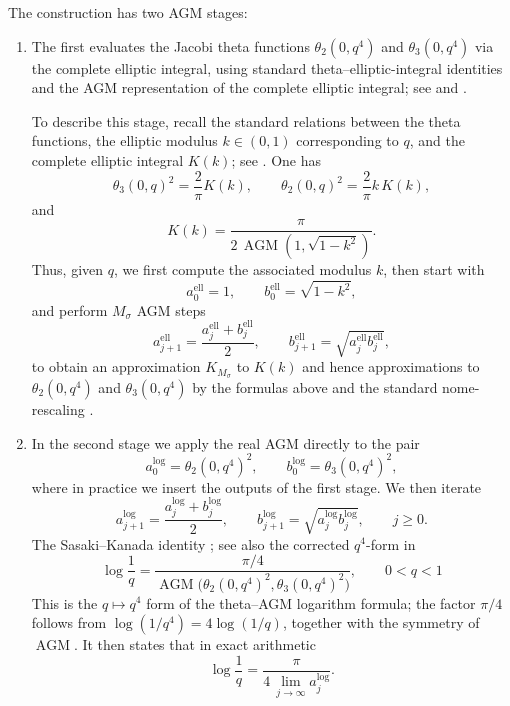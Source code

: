 \documentclass{article}
\theoremstyle{plain}
\theoremstyle{definition}
\theoremstyle{remark}
\begin{document}
The construction has two AGM stages: 
\begin{enumerate}
    \item The first evaluates the Jacobi theta functions $\theta_2(0,q^4)$ and $\theta_3(0,q^4)$ via the complete elliptic integral,  {using standard theta--elliptic-integral identities and the AGM representation of the complete elliptic integral; see \citet[Chs.~2 and 7]{borwein1987piagm} and \citet{brent2018borwein}.}

To describe this stage, recall the standard relations between the theta functions, the elliptic modulus $k\in(0,1)$ corresponding to $q$, and the complete elliptic integral $K(k)$; see  {\citet[Chs.~2 and 7]{borwein1987piagm}}. One has
\[
\theta_3(0,q)^2 = \frac{2}{\pi}K(k),
\qquad
\theta_2(0,q)^2 = \frac{2}{\pi}k\,K(k),
\]
and
\[
K(k)=\frac{\pi}{2\,\operatorname{AGM}(1,\sqrt{1-k^2})}.
\]
Thus, given $q$, we first compute the associated modulus $k$, then start with
\[
a_0^{\mathrm{ell}}=1,\qquad b_0^{\mathrm{ell}}=\sqrt{1-k^2},
\]
and perform $M_\sigma$ AGM steps
\[
a_{j+1}^{\mathrm{ell}}=\frac{a_j^{\mathrm{ell}}+b_j^{\mathrm{ell}}}{2},
\qquad
b_{j+1}^{\mathrm{ell}}=\sqrt{a_j^{\mathrm{ell}}b_j^{\mathrm{ell}}},
\]
to obtain an approximation $K_{M_\sigma}$ to $K(k)$ and hence approximations to $\theta_2(0,q^4)$ and $\theta_3(0,q^4)$ by the formulas above and the standard nome-rescaling  {\citep[Chs.~2 and 7]{borwein1987piagm}}. 

\item In the second stage we apply the real AGM directly to the pair
\[
a_0^{\log}=\theta_2(0,q^4)^2,\qquad
b_0^{\log}=\theta_3(0,q^4)^2,
\]
where in practice we insert the outputs of the first stage. We then iterate
\[
a_{j+1}^{\log}=\frac{a_j^{\log}+b_j^{\log}}{2},
\qquad
b_{j+1}^{\log}=\sqrt{a_j^{\log}b_j^{\log}},
\qquad j\ge 0.
\]
The Sasaki--Kanada identity  {\citep{sasaki1982log}; see also the corrected \(q^4\)-form in \citealt[Eq.~(40)]{brent2018borwein}}
\begin{equation}
\label{eq:sasaki-kanada}
\log\frac{1}{q}
=
\frac{\pi/4}{\operatorname{AGM}\!\bigl(\theta_2(0,q^4)^2,\theta_3(0,q^4)^2\bigr)},
\qquad 0<q<1
\end{equation}
 {This is the \(q\mapsto q^4\) form of the theta--AGM logarithm formula; the factor \(\pi/4\) follows from \(\log(1/q^4)=4\log(1/q)\), together with the symmetry of \(\operatorname{AGM}\).}
It then states that in exact arithmetic
\[
\log\frac{1}{q}
=
\frac{\pi}{4\,\lim_{j\to\infty}a_j^{\log}}.
\]
\end{enumerate}
\end{document}
